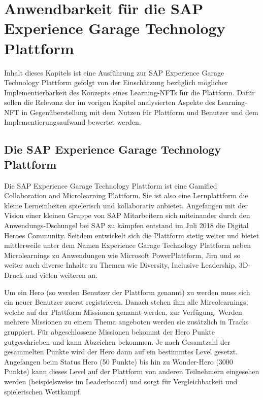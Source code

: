 \chapter{Anwendbarkeit für die SAP Experience Garage Technology Plattform}

Inhalt dieses Kapitels ist eine Ausführung zur SAP Experience Garage Technology Plattform gefolgt von der Einschätzung bezüglich möglicher Implementierbarkeit des Konzepts
eines Learning-NFTs für die Plattform.
Dafür sollen die Relevanz der im vorigen Kapitel analysierten Aspekte des Learning-NFT in Gegenüberstellung mit dem Nutzen für Plattform und Benutzer und dem Implementierungsaufwand bewertet werden.

\section{Die SAP Experience Garage Technology Plattform}

Die SAP Experience Garage Technology Plattform ist eine \dq Gamified Collaboration and Microlearning Plattform\dq{}.
Sie ist also eine Lernplattform die kleine Lerneinheiten \dq spielerisch\dq{} und kollaborativ anbietet.
Angefangen mit der Vision einer kleinen Gruppe von SAP Mitarbeitern sich miteinander durch den Anwendungs-Dschungel bei SAP zu kämpfen entstand im Juli 2018 die Digital Heroes Community.
Seitdem entwickelt sich die Plattform stetig weiter und bietet mittlerweile unter dem Namen Experience Garage Technology Plattform neben Microlearnings zu Anwendungen wie Microsoft PowerPlattform, Jira und so weiter
auch diverse Inhalte zu Themen wie Diversity, Inclusive Leadership, 3D-Druck und vielen weiteren an.

Um ein Hero (so werden Benutzer der Plattform genannt) zu werden muss sich ein neuer Benutzer zuerst registrieren.
Danach stehen ihm alle Mircolearnings, welche auf der Plattform Missionen genannt werden, zur Verfügung.
Werden mehrere Missionen zu einem Thema angeboten werden sie zusätzlich in Tracks gruppiert.
Für abgeschlossene Missionen bekommt der Hero Punkte gutgeschrieben und kann Abzeichen bekommen.
Je nach Gesamtzahl der gesammelten Punkte wird der Hero dann auf ein bestimmtes Level gesetzt.
Angefangen beim Status Hero (50 Punkte) bis hin zu Wonder-Hero (3000 Punkte) kann dieses Level auf der Plattform von anderen Teilnehmern eingesehen werden (beispielsweise im Leaderboard) und sorgt für Vergleichbarkeit und spielerischen Wettkampf.

